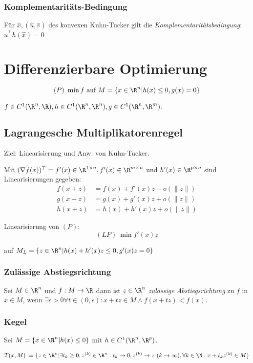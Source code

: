 \subsubsection*{Komplementaritäts-Bedingung}

Für \(\hat x, (\hat u,\hat v)\) des konvexen Kuhn-Tucker gilt die \emph{Komplementaritätsbedingung}: \(\hat u^\top h(\hat x) = 0\)

\section*{Differenzierbare Optimierung}

\[(P) \ \min f \text{ auf } M = \{ x \in \R^n | h(x) \leq 0, g(x)=0\}\]

\(f \in C^1(\R^n,\R), h \in C^1(\R^n,\R^n), g \in C^1(\R^n,\R^m)\).

\subsection*{Lagrangesche Multiplikatorenregel}

Ziel: Linearisierung und Anw. von Kuhn-Tucker.

Mit \((\nabla f(x))^\top = f'(x) \in \R^{1 \times n}, f'(x) \in \R^{m \times n}\) und \(h'(x) \in \R^{p \times n}\) sind Linearisierungen gegeben:
\begin{align*}
f(x+z) &= f(x) + f'(x)z + o(\|z\|) \\
g(x+z) &= g(x) + g'(x)z + o(\|z\|) \\
h(x+z) &= h(x) + h'(x)z + o(\|z\|)
\end{align*}

Linearisierung von \((P)\): \[(LP) \ \min f'(x)z\]

auf \(M_L = \{ z \in \R^n | h(x) + h'(x)z \leq 0, g'(x)z = 0 \}\)

\subsubsection*{Zulässige Abstiegsrichtung}

Sei \(M \in \R^n\) und \(f : M \to \R\) dann ist \(z \in \R^n\) \emph{zulässige Abstiegsrichtung} zu \(f\) in \(x \in M\), wenn \(\exists \epsilon > 0 \forall t \in (0,\epsilon) : x + tz \in M \land f(x+tz) < f(x)\).

\subsubsection*{Kegel}

Sei \(M = \{x \in \R^n | h(x) \leq 0\}\) mit \(h \in C^1(\R^n,\R^p)\).

\(T(x,M) := \{ z \in \R^n | \exists t_k \geq 0, z^{(k)} \in \R^n : t_k \to 0, z^{(k)} \to z \ (k \to \infty), \forall k \in \N : x+t_k z^{(k)} \in M\}\)
